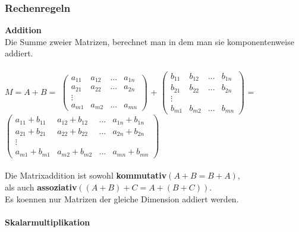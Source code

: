 \documentclass[a4paper]{article} %
\begin{document}
	\subsubsection{Rechenregeln}
	\textbf{Addition}\\
	Die Summe zweier Matrizen, berechnet man in dem man sie komponentenweise addiert.\\\\
	\small
	$M = A + B = $
	$
	\begin{pmatrix}
		a_{11} & a_{12} & ... 	& a_{1n}\\
		a_{21} & a_{22} & ...	& a_{2n}\\
		\vdots &        &	    &\\
		a_{m1} & a_{m2} & ...	& a_{mn}
	\end{pmatrix}
	$
	+
	$
	\begin{pmatrix}
	b_{11} & b_{12} & ... 	& b_{1n}\\
	b_{21} & b_{22} & ...	& b_{2n}\\
	\vdots &        &	    &\\
	b_{m1} & b_{m2} & ...	& b_{mn}
	\end{pmatrix}
	$
	=
	$
	\begin{pmatrix}
	a_{11}+b_{11} & a_{12}+b_{12} & ...    & a_{1n}+b_{1n}\\
	a_{21}+b_{21} & a_{22}+b_{22}  & ...	   & a_{2n}+ b_{2n}\\
	\vdots        &               &	       &\\
	a_{m1}+b_{m1} & a_{m2}+b_{m2} & ...	   & a_{mn}+ b_{mn}
	\end{pmatrix}
	$\\
	\\
	Die Matrixaddition ist sowohl \textbf{kommutativ}$(A+B=B+A)$,\\ als auch \textbf{assoziativ}$( (A+B)+C = A +(B+C))$.\\
	Es koennen nur Matrizen der gleiche Dimension addiert werden.\\\\
	\textbf{Skalarmultiplikation}\\
\end{document}
